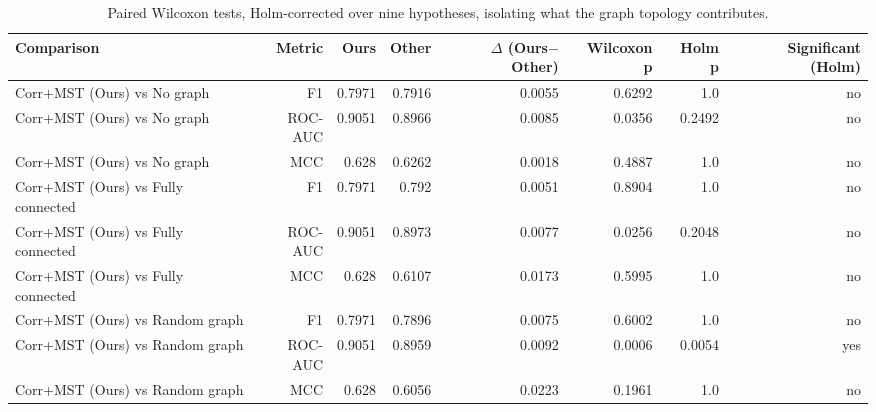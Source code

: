 \begin{table}[t]
\centering
\caption{Paired Wilcoxon tests, Holm-corrected over nine hypotheses, isolating what the graph topology contributes.}
\label{tab:toposig}
\footnotesize
\begin{tabular}{lrrrrrrr}
\toprule
Comparison & Metric & Ours & Other & $\Delta$ (Ours$-$Other) & Wilcoxon p & Holm p & Significant (Holm) \\
\midrule
Corr+MST (Ours) vs No graph & F1 & 0.7971 & 0.7916 & 0.0055 & 0.6292 & 1.0 & no \\
Corr+MST (Ours) vs No graph & ROC-AUC & 0.9051 & 0.8966 & 0.0085 & 0.0356 & 0.2492 & no \\
Corr+MST (Ours) vs No graph & MCC & 0.628 & 0.6262 & 0.0018 & 0.4887 & 1.0 & no \\
Corr+MST (Ours) vs Fully connected & F1 & 0.7971 & 0.792 & 0.0051 & 0.8904 & 1.0 & no \\
Corr+MST (Ours) vs Fully connected & ROC-AUC & 0.9051 & 0.8973 & 0.0077 & 0.0256 & 0.2048 & no \\
Corr+MST (Ours) vs Fully connected & MCC & 0.628 & 0.6107 & 0.0173 & 0.5995 & 1.0 & no \\
Corr+MST (Ours) vs Random graph & F1 & 0.7971 & 0.7896 & 0.0075 & 0.6002 & 1.0 & no \\
Corr+MST (Ours) vs Random graph & ROC-AUC & 0.9051 & 0.8959 & 0.0092 & 0.0006 & 0.0054 & yes \\
Corr+MST (Ours) vs Random graph & MCC & 0.628 & 0.6056 & 0.0223 & 0.1961 & 1.0 & no \\
\bottomrule
\end{tabular}
\end{table}
